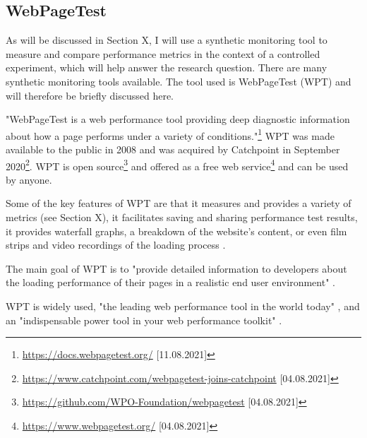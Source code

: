 



\subsection{WebPageTest} %
\label{subsection:webpagetest}

As will be discussed in Section X, I will use a synthetic monitoring tool to measure and compare performance metrics in the context of a controlled experiment, which will help answer the research question.
There are many synthetic monitoring tools available. 
The tool used is WebPageTest (WPT) and will therefore be briefly discussed here.

"WebPageTest is a web performance tool providing deep diagnostic information about how a page performs under a variety of conditions."\footnote{\url{https://docs.webpagetest.org/} [11.08.2021]}
WPT was made available to the public in 2008 and was acquired by Catchpoint in September 2020\footnote{\url{https://www.catchpoint.com/webpagetest-joins-catchpoint} [04.08.2021]}.
WPT is open source\footnote{\url{https://github.com/WPO-Foundation/webpagetest} [04.08.2021]} and offered as a free web service\footnote{\url{https://www.webpagetest.org/} [04.08.2021]} and can be used by anyone.

Some of the key features of WPT are that it measures and provides a variety of metrics (see Section X), it facilitates saving and sharing performance test results, it provides waterfall graphs, a breakdown of the website's content, or even film strips and video recordings of the loading process \cite{2016Viscomi}.

The main goal of WPT is to "provide detailed information to developers about the loading performance of their pages in a realistic end user environment" \cite{2016Viscomi}.

WPT is widely used, "the leading web performance tool in the world today" \cite{2016Viscomi}, and an "indispensable power tool in your web performance toolkit" \cite{2013Grigorik}.

